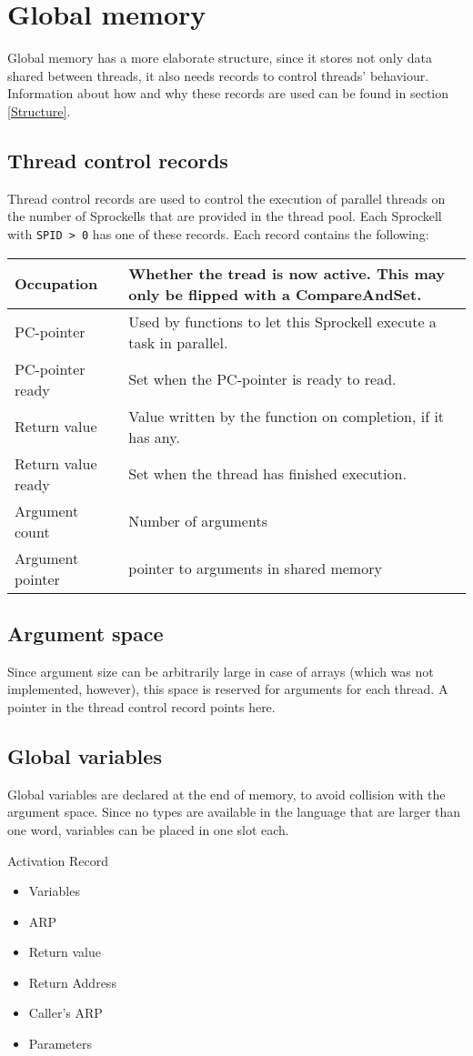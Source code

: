 \documentclass[10pt,a4paper]{report}
\begin{document}
\section{Global memory}
Global memory has a more elaborate structure, since it stores not only data shared between threads, it also needs records to control threads' behaviour. Information about how and why these records are used can be found in section \ref{Structure}. 

\subsection{Thread control records}
Thread control records are used to control the execution of parallel threads on the number of Sprockells that are provided in the thread pool. Each Sprockell with \texttt{SPID > 0} has one of these records. Each record contains the following:

\begin{tabular}{| l || l |}
\hline
Occupation & Whether the tread is now active. This may only be flipped with a CompareAndSet. \\
\hline
PC-pointer & Used by functions to let this Sprockell execute a task in parallel. \\
\hline
PC-pointer ready & Set when the PC-pointer is ready to read. \\
\hline
Return value & Value written by the function on completion, if it has any. \\
\hline
Return value ready & Set when the thread has finished execution. \\
\hline
Argument count & Number of arguments\\
\hline
Argument pointer & pointer to arguments in shared memory \\ 
\hline
\end{tabular}

\subsection{Argument space}
Since argument size can be arbitrarily large in case of arrays (which was not implemented, however), this space is reserved for arguments for each thread. A pointer in the thread control record points here.

\subsection{Global variables}
Global variables are declared at the end of memory, to avoid collision with the argument space. Since no types are available in the language that are larger than one word, variables can be placed in one slot each.



Activation Record
\begin{itemize}
	\item Variables
	\item ARP
	\item Return value
	\item Return Address
	\item Caller's ARP
	\item Parameters
\end{itemize}
\end{document}
